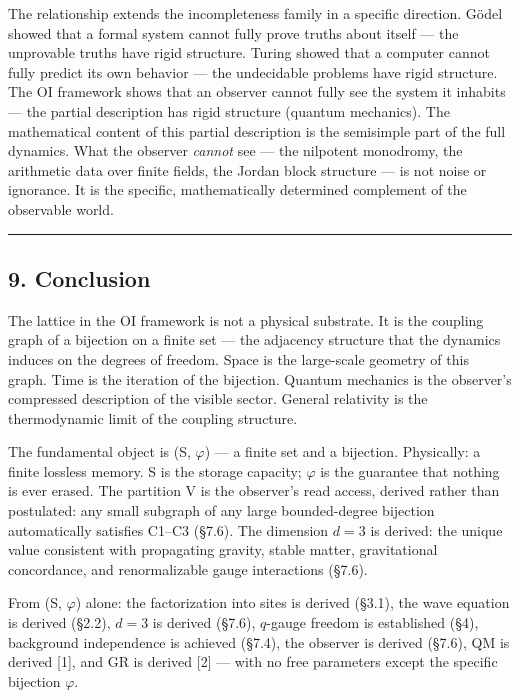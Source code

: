 \documentclass[
  11pt,
]{article}
\begin{document}
The relationship extends the incompleteness family in a specific
direction. Gödel showed that a formal system cannot fully prove truths
about itself --- the unprovable truths have rigid structure. Turing
showed that a computer cannot fully predict its own behavior --- the
undecidable problems have rigid structure. The OI framework shows that
an observer cannot fully see the system it inhabits --- the partial
description has rigid structure (quantum mechanics). The mathematical
content of this partial description is the semisimple part of the full
dynamics. What the observer \emph{cannot} see --- the nilpotent
monodromy, the arithmetic data over finite fields, the Jordan block
structure --- is not noise or ignorance. It is the specific,
mathematically determined complement of the observable world.

\begin{center}\rule{0.5\linewidth}{0.5pt}\end{center}

\hypertarget{conclusion}{%
\subsection{9. Conclusion}\label{conclusion}}

The lattice in the OI framework is not a physical substrate. It is the
coupling graph of a bijection on a finite set --- the adjacency
structure that the dynamics induces on the degrees of freedom. Space is
the large-scale geometry of this graph. Time is the iteration of the
bijection. Quantum mechanics is the observer's compressed description of
the visible sector. General relativity is the thermodynamic limit of the
coupling structure.

The fundamental object is (S, \(\varphi\)) --- a finite set and a
bijection. Physically: a finite lossless memory. S is the storage
capacity; \(\varphi\) is the guarantee that nothing is ever erased. The
partition V is the observer's read access, derived rather than
postulated: any small subgraph of any large bounded-degree bijection
automatically satisfies C1--C3 (§7.6). The dimension \(d = 3\) is
derived: the unique value consistent with propagating gravity, stable
matter, gravitational concordance, and renormalizable gauge interactions
(§7.6).

From (S, \(\varphi\)) alone: the factorization into sites is derived
(§3.1), the wave equation is derived (§2.2), \(d = 3\) is derived
(§7.6), \(q\)-gauge freedom is established (§4), background independence
is achieved (§7.4), the observer is derived (§7.6), QM is derived
{[}1{]}, and GR is derived {[}2{]} --- with no free parameters except
the specific bijection \(\varphi\).
\end{document}
